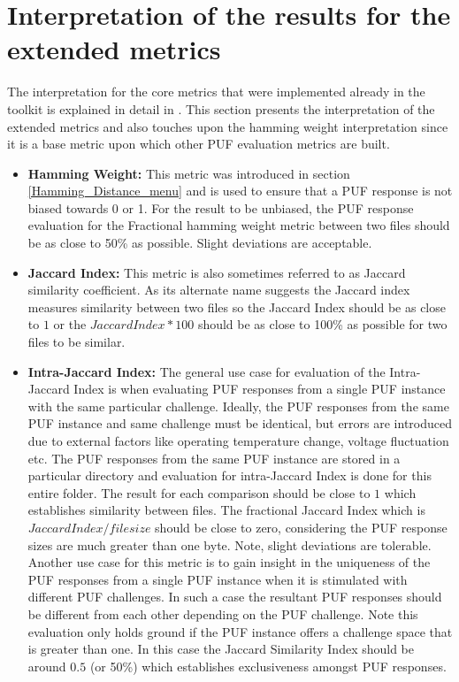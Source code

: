 \section{Interpretation of the results for the extended metrics}
The interpretation for the core metrics that were implemented already in the toolkit is explained in detail in \cite{71}. This section presents the interpretation of the extended metrics and also touches upon the hamming weight interpretation since it is a base metric upon which other PUF evaluation metrics are built.
\begin{itemize}
	\item \textbf{Hamming Weight:} This metric was introduced in section \ref{Hamming_Distance_menu} and is used to ensure that a PUF response is not biased towards 0 or 1. For the result to be unbiased, the PUF response evaluation for the Fractional hamming weight metric between two files should be as close to 50\% as possible. Slight deviations are acceptable.
	\item \textbf{Jaccard Index:} This metric is also sometimes referred to as Jaccard similarity coefficient. As its alternate name suggests the Jaccard index measures similarity between two files so the Jaccard Index should be as close to $1$ or the $Jaccard Index * 100$ should be as close to 100\% as possible for two files to be similar.
	\item \textbf{Intra-Jaccard Index:} The general use case for evaluation of the Intra-Jaccard Index is when evaluating PUF responses from a single PUF instance with the same particular challenge. Ideally, the PUF responses from the same PUF instance and same challenge must be identical, but errors are introduced due to external factors like operating temperature change, voltage fluctuation etc. The PUF responses from the same PUF instance are stored in a particular directory and evaluation
		for intra-Jaccard Index is done for this entire folder. The result for each comparison should be close to $1$ which establishes similarity between files. The fractional Jaccard Index which is $Jaccard Index / filesize$ should be close to zero, considering the PUF response sizes are much greater than one byte. Note, slight deviations are tolerable. Another use case for this metric is to gain insight in the uniqueness of the PUF responses from a single PUF instance when
		it is stimulated with different PUF challenges. In such a case the resultant PUF responses should be different from each other depending on the PUF challenge. Note this evaluation only holds ground if the PUF instance offers a challenge space that is greater than one. In this case the Jaccard Similarity Index should be around $0.5$ (or 50\%) which establishes exclusiveness amongst PUF responses.

\end{itemize}
